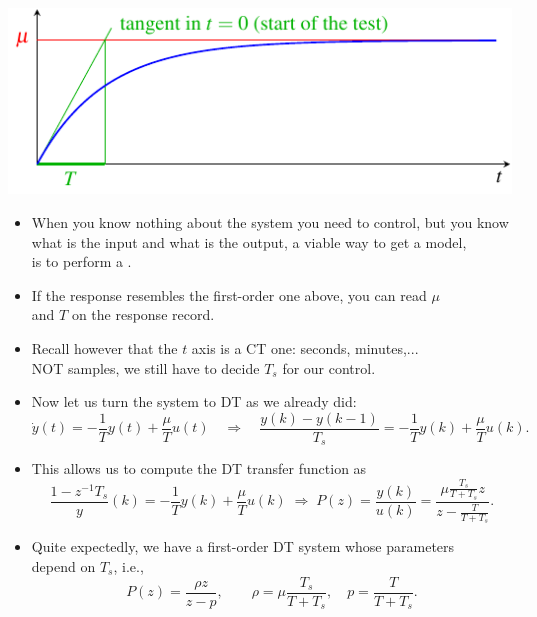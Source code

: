 \begin{frame}
\myPause
 \begin{center}
  \includegraphics[width=0.55\columnwidth]{./Unit-06/img/FOstepResponse.pdf}
 \end{center}
 \begin{itemize}[<+-| alert@+>]
 \item \vspace{-4mm}When you know nothing about the system you need to control, but you know\\
       what is the input and what is the output, a viable way to get a model,\\
       is to perform a .
 \item If the response resembles the first-order one above, you can read $\mu$\\
       and $T$ on the response record.
 \item Recall however that the $t$ axis is a CT one: seconds, minutes,...\\
       NOT samples, we still have to decide $T_s$ for our control.
 \end{itemize}
\end{frame}

\begin{frame}[label={pag:FOsystem-DT}]
\myPause
 \begin{itemize}[<+-| alert@+>]
 \item Now let us turn the system to DT as we already did:
       \begin{displaymath}
        \dot{y}(t) = -\frac{1}{T}y(t) + \frac{\mu}{T} u(t) \quad \Rightarrow \quad
        \frac{y(k)-y(k-1)}{T_s} = -\frac{1}{T}y(k) + \frac{\mu}{T} u(k). 
       \end{displaymath}
 \item This allows us to compute the DT transfer function as
       \begin{displaymath}
        \frac{1-z^{-1}{T_s}}y(k) = -\frac{1}{T}y(k) + \frac{\mu}{T} u(k) \; \Rightarrow \;
        P(z) = \frac{y(k)}{u(k)} = \frac{\mu\frac{T_s}{T+T_s}z}{z-\frac{T}{T+T_s}}.
       \end{displaymath}
 \item Quite expectedly, we have a first-order DT system whose parameters\\
       depend on $T_s$, i.e.,
       \begin{displaymath}
        P(z) = \frac{\rho z}{z-p}, \qquad
        \rho = \mu\frac{T_s}{T+T_s}, \quad
        p    = \frac{T}{T+T_s}.
       \end{displaymath}
 \end{itemize}
\end{frame}

